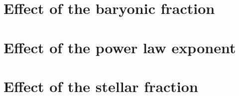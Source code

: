 	\section{Effect of the baryonic fraction}
	
	\section{Effect of the power law exponent}
	
	\section{Effect of the stellar fraction}
	
%
%	